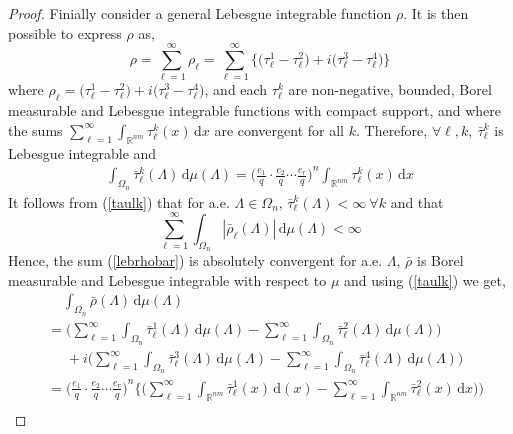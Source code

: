 \documentclass[11pt]{article}
\theoremstyle{definition}
\theoremstyle{proof}
\begin{document}
\begin{proof}
    Finially consider a general Lebesgue integrable function $\rho$.
    It is then possible to express $\rho$ as,
    \[
        \rho = \sum_{\ell = 1}^{\infty} \rho _\ell = \sum_{\ell=1}^{\infty} \big\{\big({\tau }_{\ell}^{1} - {\tau }_{\ell}^{2}\big) + i \big({\tau }_{\ell}^{3} - {\tau }_{\ell}^{4}\big)\big\}
    \]
    where $\rho _\ell = \big({\tau }_{\ell}^{1} - {\tau }_{\ell}^{2}\big) + i \big({\tau }_{\ell}^{3} - {\tau }_{\ell}^{4}\big)$, and each ${\tau }_{\ell}^{k}$ are non-negative, bounded, Borel measurable and Lebesgue integrable functions with compact support, and where the sums $\sum\limits_{\ell=1}^{\infty} \displaystyle\int_{\mathbb{R}^{nm}}{\tau }_{\ell}^{k}(x) \, \mathrm{d} x$ are convergent for all $k$.
    Therefore, $\forall \ell, k, \ {\bar{\tau }}_{\ell}^{k}$ is Lebesgue integrable and
    \begin{align}\label{taulk}
        \int_{{\Omega}_n}{\bar{\tau }}_{\ell}^{k} (\Lambda ) \, \mathrm{d} \mu (\Lambda ) = {\bigg(\frac{e_1}{q} \cdot \frac{e_2}{q} \cdots \frac{e_r}{q} \bigg)}^n \int_{\mathbb{R}^{nm}} {\tau }_{\ell}^{k}(x) \, \mathrm{d} x
    \end{align}
    It follows from (\ref{taulk}) that for a.e. $\Lambda \in {\Omega}_n, \, {\bar{\tau }}_{\ell}^{k}(\Lambda ) < \infty \ \forall k$ and that
    \[
        \displaystyle\sum\limits_{\ell = 1}^{\infty} \int_{{\Omega}_n} | \bar{\rho }_\ell (\Lambda )| \, \mathrm{d} \mu (\Lambda ) < \infty
    \]
    Hence, the sum (\ref{lebrhobar}) is absolutely convergent for a.e. $\Lambda$, $\bar{\rho }$ is Borel measurable and Lebesgue integrable with respect to $\mu$ and using (\ref{taulk}) we get,
    \begin{align*}\label{halfrogersend}
        & \ \ \ \ \ \int_{{\Omega}_n} \bar{\rho }(\Lambda ) \, \mathrm{d} \mu (\Lambda ) \\
        &= \Bigg(\sum_{\ell=1}^{\infty} \int_{{\Omega}_n}{\bar{\tau }}_{\ell}^{1}(\Lambda ) \, \mathrm{d} \mu (\Lambda ) - \sum_{\ell=1}^{\infty}\int_{{\Omega}_n} {\bar{\tau }}_{\ell}^{2} (\Lambda ) \, \mathrm{d} \mu (\Lambda ) \Bigg) \\
        & \ \ \ \ \ \ + i \Bigg(\sum_{\ell=1}^{\infty} \int_{{\Omega}_n}{\bar{\tau }}_{\ell}^{3}(\Lambda ) \, \mathrm{d} \mu (\Lambda ) - \sum_{\ell=1}^{\infty}\int_{{\Omega}_n} {\bar{\tau }}_{\ell}^{4} (\Lambda ) \, \mathrm{d} \mu (\Lambda ) \Bigg) \\
        &= {\bigg(\frac{e_1}{q} \cdot \frac{e_2}{q} \cdots \frac{e_r}{q} \bigg)}^n \Bigg\{\Bigg(\sum_{\ell=1}^{\infty} \int_{\mathbb{R}^{nm}}{\bar{\tau }}_{\ell}^{1}(x) \, \mathrm{d} (x) - \sum_{\ell=1}^{\infty}\int_{\mathbb{R}^{nm}} {\bar{\tau }}_{\ell}^{2} (x) \, \mathrm{d} x) \Bigg) \\

\end{align*}
\end{proof}
\end{document}
